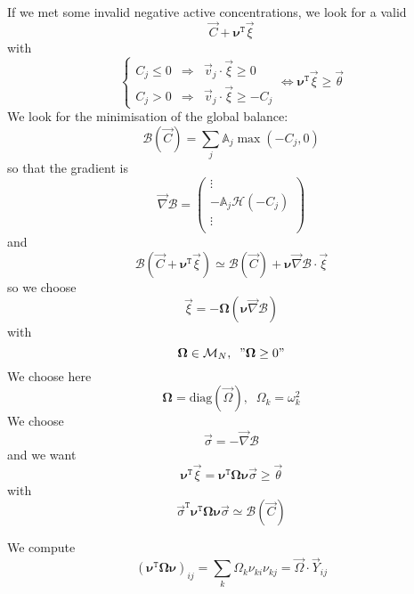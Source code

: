 \documentclass[aps,12pt]{revtex4}
\newcommand{\trn}[1]{{#1}^{\mathtt{T}}}
\begin{document}
If we met some invalid negative active concentrations, we look for a valid
\begin{equation}
	\vec{C} + \trn{\bm{\nu}} \vec{\xi}
\end{equation}
with
\begin{equation}
\left\lbrace
\begin{array}{rcl}
	C_j \leq 0 & \Rightarrow & \vec{v}_j \cdot \vec{\xi} \geq 0\\
	C_j > 0    & \Rightarrow & \vec{v}_j \cdot \vec{\xi} \geq -C_j
\end{array}
\right.
\Leftrightarrow \trn{\bm{\nu}} \vec{\xi} \geq \vec{\theta}
\end{equation}
We look for the minimisation  of the global balance:
\begin{equation}
	\mathcal{B}(\vec{C}) = \sum_j \mathbb{A}_j \max(-C_j,0)
\end{equation}
so that the gradient is
\begin{equation}
	\vec{\nabla} \mathcal{B} = 
	\begin{pmatrix}
	\vdots\\
	- \mathbb{A}_j \mathcal{H}(-C_j)\\
	\vdots\\
	\end{pmatrix}
\end{equation}
and
\begin{equation}
	\mathcal{B}(\vec{C} + \trn{\bm{\nu}} \vec{\xi}) \simeq \mathcal{B}(\vec{C}) + \bm{\nu} \vec{\nabla} \mathcal{B} \cdot \vec{\xi}
\end{equation}
so we choose
\begin{equation}
	\vec{\xi} = -\bm{\Omega} (\bm{\nu} \vec{\nabla} \mathcal{B} )
\end{equation}
with
\begin{equation}
	\bm{\Omega} \in \mathcal{M}_N,\;\; "\bm{\Omega}\geq0"
\end{equation}
We choose here
\begin{equation}
	\bm{\Omega} = \mathrm{diag}\left(\vec{\Omega}\right),\;\;\Omega_k = \omega_k^2
\end{equation}
We choose
\begin{equation}
	\vec{\sigma}= -\vec{\nabla} \mathcal{B}
\end{equation}
and we want
\begin{equation}
	\trn{\bm{\nu}}\vec{\xi} = \trn{\bm{\nu}} \bm{\Omega} \bm{\nu} \vec{\sigma} \geq \vec{\theta}
\end{equation}
with
\begin{equation}
	\trn{\vec{\sigma}} \trn{\bm{\nu}} \bm{\Omega} \bm{\nu} \vec{\sigma} \simeq \mathcal{B}(\vec{C})
\end{equation}

We compute
\begin{equation}
	 (\trn{\bm{\nu}} \bm{\Omega} \bm{\nu} )_{ij} = \sum_k \Omega_k \nu_{ki}\nu_{kj} = \vec{\Omega} \cdot \vec{Y}_{ij}
\end{equation}
\end{document}
